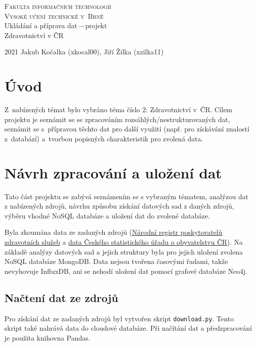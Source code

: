 \documentclass[11pt, a4paper]{article}
\title{}
\author{}
\date{}
\theoremstyle{definition}
\theoremstyle{plain}
\begin{document}
\begin{titlepage}
    \begin{center}
    \Huge
    \textsc{Fakulta informačních technologií \\[0.4em] Vysoké učení technické v~Brně}\\
    \LARGE Ukládání a příprava dat\,–-\,projekt\\[0.3em]
    Zdravotnictví v ČR\\
    \end{center}
    {\Large 2021 \hfill Jakub Kočalka (xkocal00), Jiří Žilka (xzilka11)}
\end{titlepage}

\section*{Úvod}

Z~nabízených témat bylo vybráno téma číslo 2: Zdravotnictví v~ČR. Cílem projektu je seznámit se se zpracováním rozsáhlých/nestrukturovaných dat, seznámit se s~přípravou těchto dat pro další využití (např. pro získávání znalostí z~databází) a~tvorbou popisných charakteristik pro zvolená data.

\section{Návrh zpracování a uložení dat}
Tato část projektu se zabývá seznámením se s vybraným tématem, analýzou dat z nabízených zdrojů, návrhu způsobu získání datových sad z daných zdrojů, výběru vhodné NoSQL databáze a uložení dat do zvolené databáze.

Byla zkoumána data ze zadaných zdrojů (\href{https://nrpzs.uzis.cz/index.php?pg=home--download&archiv=sluzby}{Národní registr poskytovatelů zdravotních služeb} a \href{https://www.czso.cz/csu/czso/obyvatelstvo-podle-petiletych-vekovych-skupin-a-pohlavi-v-krajich-a-okresech}{data Českého statistického úřadu o obyvatelstvu ČR}). Na základě analýzy datových sad a jejich struktury byla pro jejich uložení zvolena NoSQL databáze MongoDB. Data nejsou tvořena časovými řadami, takže nevyhovuje InfluxDB, ani se nehodí uložení dat pomocí grafové databáze Neo4j. 

\subsection{Načtení dat ze zdrojů}
Pro získání dat ze zadaných zdrojů byl vytvořen skript \texttt{download.py}. Tento skript také nahrává data do cloudové databáze. Při načítání dat a předzpracování je použita knihovna Pandas.
\end{document}
